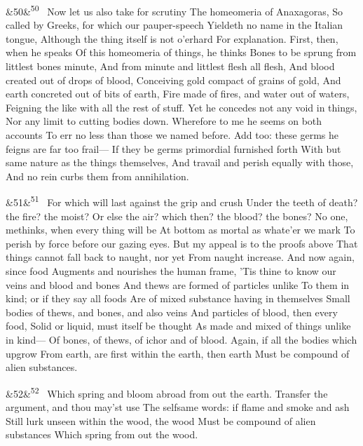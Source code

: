 \documentclass[12pt]{article}
\newcommand{\para}[1][]{\par\noindent\ifx&#1&\else\textsuperscript{\footnotesize #1}~\fi}
\begin{document}
\para[50] Now let us also take for scrutiny The homeomeria of Anaxagoras, So called by Greeks, for which our pauper-speech Yieldeth no name in the Italian tongue, Although the thing itself is not o'erhard For explanation. First, then, when he speaks Of this homeomeria of things, he thinks Bones to be sprung from littlest bones minute, And from minute and littlest flesh all flesh, And blood created out of drops of blood, Conceiving gold compact of grains of gold, And earth concreted out of bits of earth, Fire made of fires, and water out of waters, Feigning the like with all the rest of stuff. Yet he concedes not any void in things, Nor any limit to cutting bodies down. Wherefore to me he seems on both accounts To err no less than those we named before. Add too: these germs he feigns are far too frail--- If they be germs primordial furnished forth With but same nature as the things themselves, And travail and perish equally with those, And no rein curbs them from annihilation.

\para[51] For which will last against the grip and crush Under the teeth of death? the fire? the moist? Or else the air? which then? the blood? the bones? No one, methinks, when every thing will be At bottom as mortal as whate'er we mark To perish by force before our gazing eyes. But my appeal is to the proofs above That things cannot fall back to naught, nor yet From naught increase. And now again, since food Augments and nourishes the human frame, 'Tis thine to know our veins and blood and bones And thews are formed of particles unlike To them in kind; or if they say all foods Are of mixed substance having in themselves Small bodies of thews, and bones, and also veins And particles of blood, then every food, Solid or liquid, must itself be thought As made and mixed of things unlike in kind--- Of bones, of thews, of ichor and of blood. Again, if all the bodies which upgrow From earth, are first within the earth, then earth Must be compound of alien substances.

\para[52] Which spring and bloom abroad from out the earth. Transfer the argument, and thou may'st use The selfsame words: if flame and smoke and ash Still lurk unseen within the wood, the wood Must be compound of alien substances Which spring from out the wood.
\end{document}
